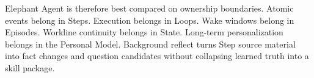 Elephant Agent is therefore best compared on ownership boundaries. Atomic events belong
in Steps. Execution belongs in Loops. Wake windows belong in Episodes.
Workline continuity belongs in State. Long-term personalization belongs in the
Personal Model. Background reflect turns Step source material into fact changes
and question candidates without collapsing learned truth into a skill package.
